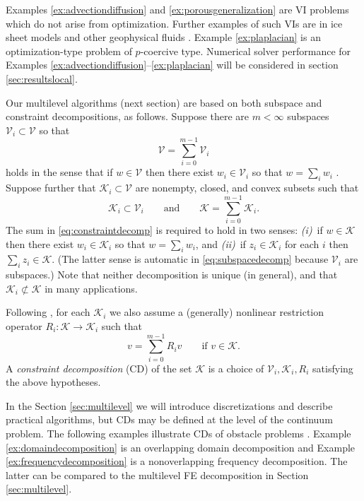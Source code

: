 \documentclass[letterpaper,final,12pt,reqno]{amsart}
\theoremstyle{cstyle}
\theoremstyle{dstyle}
\numberwithin{equation}{section}
\numberwithin{figure}{section}
\numberwithin{table}{section}
\numberwithin{theorem}{section}
\newcommand{\cK}{\mathcal{K}}
\newcommand{\cV}{\mathcal{V}}
\begin{document}
Examples \ref{ex:advectiondiffusion} and \ref{ex:porousgeneralization} are VI problems which do not arise from optimization.  Further examples of such VIs are in ice sheet models \cite{Calvoetal2002,JouvetBueler2012} and other geophysical fluids \cite{Bueler2021conservation}.  Example \ref{ex:plaplacian} is an optimization-type problem of $p$-coercive type.  Numerical solver performance for Examples \ref{ex:advectiondiffusion}--\ref{ex:plaplacian} will be considered in section \ref{sec:resultslocal}.  %

Our multilevel algorithms (next section) are based on both subspace and constraint decompositions, as follows.  Suppose there are $m<\infty$ subspaces $\cV_i \subset \cV$ so that
\begin{equation}
\cV = \sum_{i=0}^{m-1} \cV_i \label{eq:subspacedecomp}
\end{equation}
holds in the sense that if $w \in \cV$ then there exist $w_i \in \cV_i$ so that $w = \sum_i w_i$ \cite{Xu1992}.  Suppose further that $\cK_i \subset \cV$ are nonempty, closed, and convex subsets such that
\begin{equation}
\cK_i \subset \cV_i \qquad \text{and} \qquad \cK = \sum_{i=0}^{m-1} \cK_i. \label{eq:constraintdecomp}
\end{equation}
The sum in \eqref{eq:constraintdecomp} is required to hold in two senses: \emph{(i)}~if $w \in \cK$ then there exist $w_i \in \cK_i$ so that $w = \sum_i w_i$, and \emph{(ii)}~if $z_i \in \cK_i$ for each $i$ then $\sum_i z_i \in \cK$.  (The latter sense is automatic in \eqref{eq:subspacedecomp} because $\cV_i$ are subspaces.)  Note that neither decomposition is unique (in general), and that $\cK_i \not\subset \cK$ in many applications.

Following \cite{Tai2003}, for each $\cK_i$ we also assume a (generally) nonlinear restriction operator $R_i : \cK \to \cK_i$ such that %
\begin{equation}
v = \sum_{i=0}^{m-1} R_i v \qquad \text{if } v \in \cK.  \label{eq:constraintrestrictionsum}
\end{equation}
A \emph{constraint decomposition} (CD) of the set $\cK$ is a choice of $\cV_i,\cK_i,R_i$ satisfying the above hypotheses.

In the Section \ref{sec:multilevel} we will introduce discretizations and describe practical algorithms, but CDs may be defined at the level of the continuum problem.  The following examples illustrate CDs of obstacle problems \cite{GraeserKornhuber2009}.   Example \ref{ex:domaindecomposition} is an overlapping domain decomposition and Example \ref{ex:frequencydecomposition} is a nonoverlapping frequency decomposition.  The latter can be compared to the multilevel FE decomposition in Section \ref{sec:multilevel}.
\end{document}
